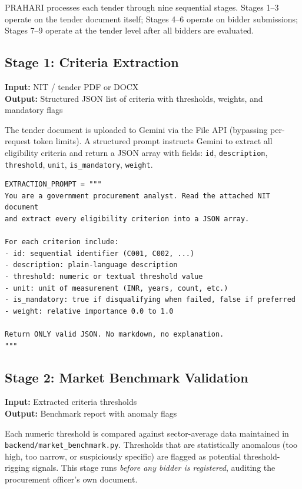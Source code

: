 \documentclass[12pt,a4paper]{article}
\begin{document}
PRAHARI processes each tender through nine sequential stages. Stages 1--3 operate
on the tender document itself; Stages 4--6 operate on bidder submissions; Stages
7--9 operate at the tender level after all bidders are evaluated.

\subsection{Stage 1: Criteria Extraction}

\textbf{Input:} NIT / tender PDF or DOCX \\
\textbf{Output:} Structured JSON list of criteria with thresholds, weights, and mandatory flags

The tender document is uploaded to Gemini via the File API (bypassing per-request
token limits). A structured prompt instructs Gemini to extract all eligibility criteria
and return a JSON array with fields: \texttt{id}, \texttt{description},
\texttt{threshold}, \texttt{unit}, \texttt{is\_mandatory}, \texttt{weight}.

\begin{lstlisting}[style=pythonstyle, caption={Criteria extraction prompt structure}]
EXTRACTION_PROMPT = """
You are a government procurement analyst. Read the attached NIT document
and extract every eligibility criterion into a JSON array.

For each criterion include:
- id: sequential identifier (C001, C002, ...)
- description: plain-language description
- threshold: numeric or textual threshold value
- unit: unit of measurement (INR, years, count, etc.)
- is_mandatory: true if disqualifying when failed, false if preferred
- weight: relative importance 0.0 to 1.0

Return ONLY valid JSON. No markdown, no explanation.
"""
\end{lstlisting}

\subsection{Stage 2: Market Benchmark Validation}

\textbf{Input:} Extracted criteria thresholds \\
\textbf{Output:} Benchmark report with anomaly flags

Each numeric threshold is compared against sector-average data maintained in
\texttt{backend/market\_benchmark.py}. Thresholds that are statistically anomalous
(too high, too narrow, or suspiciously specific) are flagged as potential
threshold-rigging signals. This stage runs \textit{before any bidder is registered},
auditing the procurement officer's own document.
\end{document}

